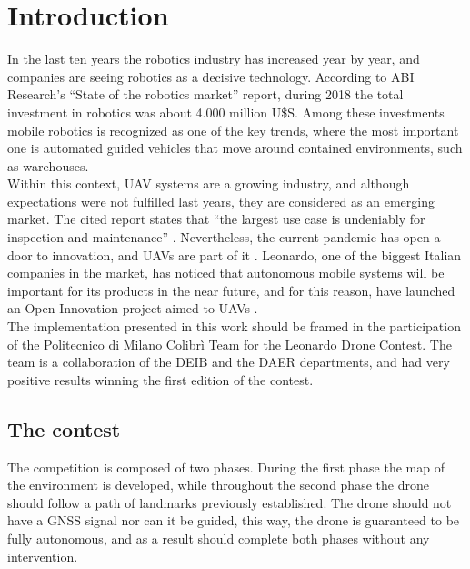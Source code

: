 \cleardoublepage
\chapter{Introduction}
\label{ch:chapter0:intro}
In the last ten years the robotics industry has increased year by year, and companies are seeing robotics as a decisive technology. According to ABI Research's \cite{abi-report} \enquote{State of the robotics market} report, during 2018 the total investment in robotics was about 4.000 million U\$S. Among these investments mobile robotics is recognized as one of the key trends, where the most important one is automated guided vehicles that move around contained environments, such as warehouses. \\

Within this context, \ac{UAV} systems are a growing industry, and although expectations were not fulfilled last years, they are considered as an emerging market. The cited report states that \enquote{the largest use case is undeniably for inspection and maintenance} \cite{abi-report}. Nevertheless, the current pandemic has open a door to innovation, and \ac{UAV}s are part of it \cite{eu-robotics-covid}. Leonardo, one of the biggest Italian companies in the market, has noticed that autonomous mobile systems will be important for its products in the near future, and for this reason, have launched an Open Innovation project aimed to \ac{UAV}s \cite{leonardo-drone-contest}.\\

The implementation presented in this work should be framed in the participation of the Politecnico di Milano Colibrì Team for the Leonardo Drone Contest. The team is a collaboration of the DEIB and the DAER departments, and had very positive results winning the first edition of the contest. %
\section*{The contest}
The competition is composed of two phases. During the first phase the map of the environment is developed, while throughout the second phase the drone should follow a path of landmarks previously established. The drone should not have a GNSS signal nor can it be guided, this way, the drone is guaranteed to be fully autonomous, and as a result should complete both phases without any intervention.\\

